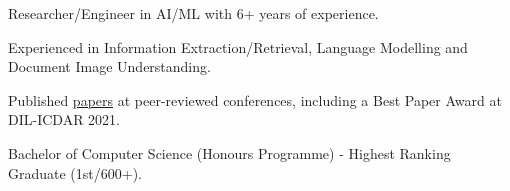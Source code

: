 % 
\vspace{.6em}
\begin{zitemize}
    \item Researcher/Engineer in AI/ML with 6+ years of experience.
    \item Experienced in Information Extraction/Retrieval, Language Modelling and Document Image Understanding.
    \item Published \href{https://scholar.google.com/citations?user=\gscholarid}{papers} at
    peer-reviewed conferences, including a Best Paper Award at DIL-ICDAR 2021.
    \item Bachelor of Computer Science (Honours Programme) - Highest Ranking Graduate (1st/600+).
\end{zitemize}
